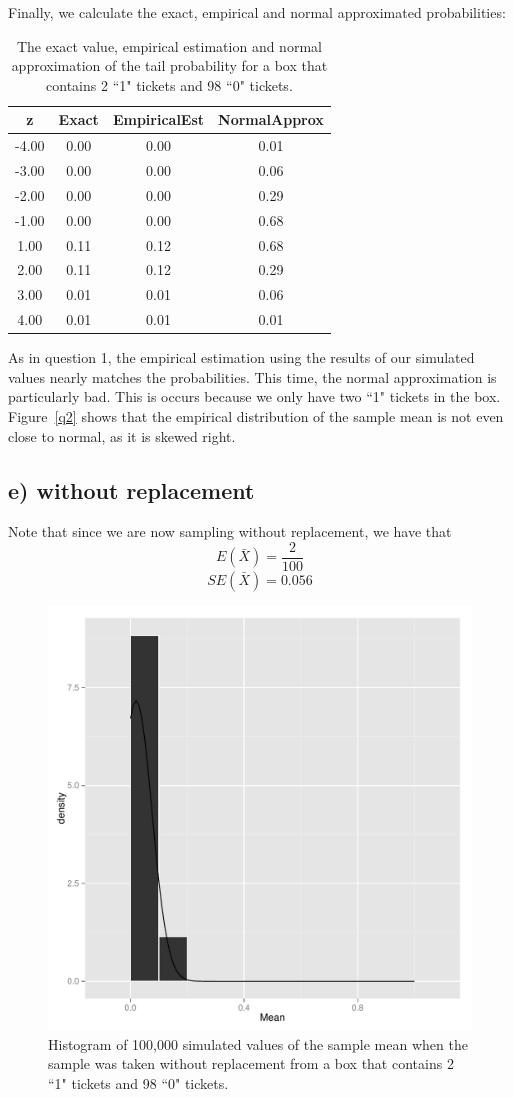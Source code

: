 \documentclass[11pt]{article}
\begin{document}
\noindent Finally, we calculate the exact, empirical and normal approximated probabilities:
\begin{table}[H]
\centering
\begin{tabular}{|c|ccc|}
  \hline
z & Exact & EmpiricalEst & NormalApprox \\ 
  \hline
-4.00 & 0.00 & 0.00 & 0.01 \\ 
  -3.00 & 0.00 & 0.00 & 0.06 \\ 
  -2.00 & 0.00 & 0.00 & 0.29 \\ 
  -1.00 & 0.00 & 0.00 & 0.68 \\ 
  1.00 & 0.11 & 0.12 & 0.68 \\ 
  2.00 & 0.11 & 0.12 & 0.29 \\ 
  3.00 & 0.01 & 0.01 & 0.06 \\ 
  4.00 & 0.01 & 0.01 & 0.01 \\ 
   \hline
\end{tabular}
\caption{The exact value, empirical estimation and normal approximation of the tail probability for a box that contains 2 ``1" tickets and 98 ``0" tickets.} 
\end{table}

\noindent As in question 1, the empirical estimation using the results of our simulated values nearly matches the probabilities. This time, the normal approximation is particularly bad. This is occurs because we only have two ``1" tickets in the box.  Figure~\ref{q2} shows that the empirical distribution of the sample mean is not even close to normal, as it is skewed right.  


\subsection*{e) without replacement}


\noindent Note that since we are now sampling without replacement, we have that
$$E(\bar{X})= \frac{2}{100}$$ 
$$SE(\bar{X}) = 0.056$$


\begin{figure}[H]
\centering
\includegraphics[width = .5\textwidth]{histogram_2e-1.pdf}
\caption{Histogram of 100,000 simulated values of the sample mean when the sample was taken without replacement from  a box that contains 2 ``1" tickets and 98 ``0" tickets.}
\end{figure}
\end{document}
